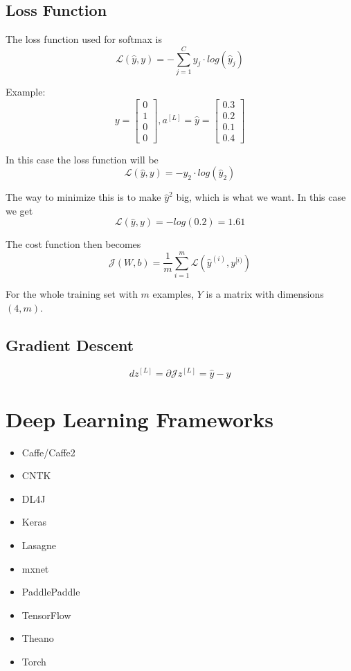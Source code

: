 \subsection*{Loss Function}

The loss function used for softmax is
\[ \mathcal{L}(\hat{y}, y)= -\sum_{j=1}^Cy_j \cdot log(\hat{y}_j) \]

Example:
\[
    y = 
    \begin{bmatrix}
        0 \\
        1 \\
        0 \\
        0
    \end{bmatrix}
    ,
    a^{[L]} =
    \hat{y} =
    \begin{bmatrix}
        0.3 \\
        0.2 \\
        0.1 \\
        0.4 
    \end{bmatrix}    
\]

In this case the loss function will be
\[ \mathcal{L}(\hat{y}, y) = - y_2 \cdot log(\hat{y}_2) \]

The way to minimize this is to make $\hat{y}^2$ big, which is what we want. In this case we get
\[ \mathcal{L}(\hat{y}, y) = - log(0.2) = 1.61 \]

The cost function then becomes
\[
    \mathcal{J}(W,b) = \frac{1}{m} \sum_{i=1}^m \mathcal{L}(\hat{y}^{(i)}, y^{[i)}) \]

For the whole training set with $m$ examples, $Y$ is a matrix with dimensions $(4, m)$.

\subsection*{Gradient Descent}


\[
    dz^{[L]} = \partial{\mathcal{J}}{z^{[L]}} = \hat{y} - y 
\]

\section*{Deep Learning Frameworks}

\begin{itemize}
    \item Caffe/Caffe2
    \item CNTK
    \item DL4J
    \item Keras
    \item Lasagne
    \item mxnet
    \item PaddlePaddle
    \item TensorFlow
    \item Theano
    \item Torch
\end{itemize}

